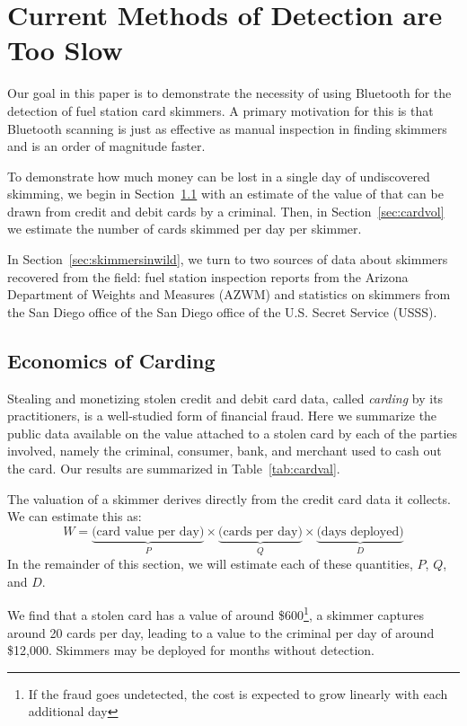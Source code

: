 \section{Current Methods of Detection are Too Slow}
\label{sec:arizona}

Our goal in this paper is to demonstrate the necessity of using Bluetooth for the detection of fuel station card
skimmers. A primary motivation for this is that Bluetooth scanning is just as effective as manual inspection
in finding skimmers and is an order of magnitude faster.

To demonstrate how much money can be lost in a single day of undiscovered skimming, we begin in
Section~\ref{subsec:cardval} with an estimate of the value of that can be drawn from credit and debit cards by a
criminal. Then, in Section~\ref{sec:cardvol} we estimate the number of cards skimmed per day per skimmer.

In Section~\ref{sec:skimmersinwild}, we turn to two sources of data about skimmers recovered from the field: fuel
station inspection reports from the Arizona Department of Weights and Measures (AZWM) and statistics on skimmers from
the San Diego office of the San Diego office of the U.S. Secret Service (USSS).

\subsection{Economics of Carding}\label{subsec:cardval}

Stealing and monetizing stolen credit and debit card data, called \emph{carding} by its practitioners, is a well-studied
form of financial fraud. Here we summarize the public data available on the value attached to a stolen card by each of the
parties involved, namely the criminal, consumer, bank, and merchant used to cash out the card. Our results are summarized
in Table~\ref{tab:cardval}.

The valuation of a skimmer derives directly from the credit card data it collects. We can estimate this as:
%
\[W = \underbrace{\textrm{(card value per day)}}_{P}
\times \underbrace{\textrm{(cards per day)}}_{Q}
\times \underbrace{\textrm{(days deployed)}}_{D}\]
%
In the remainder of this section, we will estimate each of these quantities, $P$, $Q$, and $D$.

We find that a stolen card has a value of around \$600\footnote{If the fraud goes undetected, the cost is expected to
grow linearly with each additional day}, a skimmer captures around 20 cards per day, leading to a value to the criminal
per day of around \$12,000. Skimmers may be deployed for months without detection.

